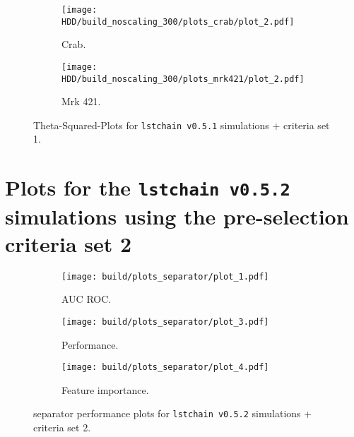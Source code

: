 \begin{figure}
    \centering
    \begin{subfigure}{0.49\textwidth}
        \centering
        \texttt{[image: HDD/build\_noscaling\_300/plots\_crab/plot\_2.pdf]}
        \caption{Crab.}
        \label{fig:crab_oldMC_300}
    \end{subfigure}
    \hfill
    \begin{subfigure}{0.49\textwidth}
        \centering
        \texttt{[image: HDD/build\_noscaling\_300/plots\_mrk421/plot\_2.pdf]}
        \caption{Mrk 421.}
        \label{fig:mrk_oldMC_300}
    \end{subfigure}
    \caption{Theta-Squared-Plots for \texttt{lstchain v0.5.1} simulations + criteria set 1.}
\end{figure}


\section{Plots for the \texttt{lstchain v0.5.2} simulations using the pre-selection criteria set 2}
\begin{figure}
    \centering
    \begin{subfigure}{0.49\textwidth}
        \centering
        \texttt{[image: build/plots\_separator/plot\_1.pdf]}
        \caption{AUC ROC.}
        \label{fig:separator_newMC_150_1}
    \end{subfigure}
    \hfill
    \begin{subfigure}{0.49\textwidth}
        \centering
        \texttt{[image: build/plots\_separator/plot\_3.pdf]}
        \caption{Performance.}
        \label{fig:separator_newMC_150_2}
    \end{subfigure}
    \newline\vfill
    \begin{subfigure}{0.49\textwidth}
        \centering
        \texttt{[image: build/plots\_separator/plot\_4.pdf]}
        \caption{Feature importance.}
        \label{fig:separator_newMC_150_feature}
    \end{subfigure}
    \caption{separator performance plots for \texttt{lstchain v0.5.2} simulations + criteria set 2.}
\end{figure}

